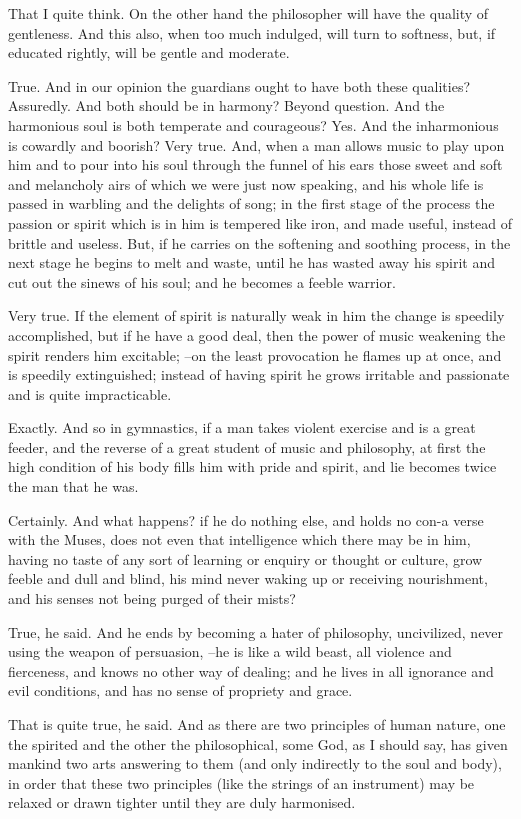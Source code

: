 That I quite think.
On the other hand the philosopher will have the quality of gentleness. And this also, when too much indulged, will turn to softness, but, if educated rightly, will be gentle and moderate.

True.
And in our opinion the guardians ought to have both these qualities?
Assuredly.
And both should be in harmony?
Beyond question.
And the harmonious soul is both temperate and courageous?
Yes.
And the inharmonious is cowardly and boorish?
Very true.
And, when a man allows music to play upon him and to pour into his soul through the funnel of his ears those sweet and soft and melancholy airs of which we were just now speaking, and his whole life is passed in warbling and the delights of song; in the first stage of the process the passion or spirit which is in him is tempered like iron, and made useful, instead of brittle and useless. But, if he carries on the softening and soothing process, in the next stage he begins to melt and waste, until he has wasted away his spirit and cut out the sinews of his soul; and he becomes a feeble warrior.

Very true.
If the element of spirit is naturally weak in him the change is speedily accomplished, but if he have a good deal, then the power of music weakening the spirit renders him excitable; --on the least provocation he flames up at once, and is speedily extinguished; instead of having spirit he grows irritable and passionate and is quite impracticable.

Exactly.
And so in gymnastics, if a man takes violent exercise and is a great feeder, and the reverse of a great student of music and philosophy, at first the high condition of his body fills him with pride and spirit, and lie becomes twice the man that he was.

Certainly.
And what happens? if he do nothing else, and holds no con-a verse with the Muses, does not even that intelligence which there may be in him, having no taste of any sort of learning or enquiry or thought or culture, grow feeble and dull and blind, his mind never waking up or receiving nourishment, and his senses not being purged of their mists?

True, he said.
And he ends by becoming a hater of philosophy, uncivilized, never using the weapon of persuasion, --he is like a wild beast, all violence and fierceness, and knows no other way of dealing; and he lives in all ignorance and evil conditions, and has no sense of propriety and grace.

That is quite true, he said.
And as there are two principles of human nature, one the spirited and the other the philosophical, some God, as I should say, has given mankind two arts answering to them (and only indirectly to the soul and body), in order that these two principles (like the strings of an instrument) may be relaxed or drawn tighter until they are duly harmonised.

